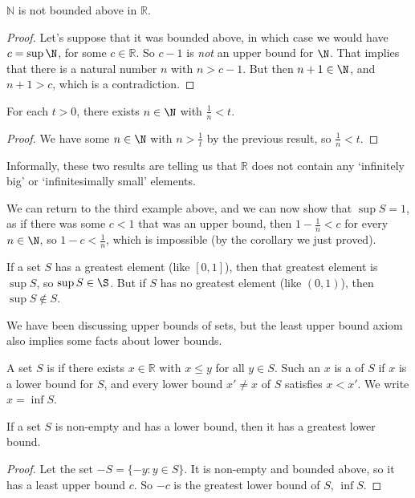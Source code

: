 \documentclass[a4paper]{scrartcl}
\begin{document}
\begin{theorem}
	$\mathbb{N}$ is not bounded above in $\mathbb{R}$.
\end{theorem}
\begin{proof}
	Let's suppose that it was bounded above, in which case we would have $c = \sup \N$, for some $c \in \mathbb{R}$. So $c - 1$ is \emph{not} an upper bound for $\N$. That implies that there is a natural number $n$ with $n > c - 1$. But then $n +1 \in \N$, and $n + 1 > c$, which is a contradiction.
\end{proof}

\begin{corollary}
	For each $t > 0$, there exists $n \in \N$ with $\frac{1}{n} < t$.
\end{corollary}
\begin{proof}
	We have some $n \in \N$ with $n > \frac{1}{t}$ by the previous result, so $\frac{1}{n} < t$.
\end{proof}

\begin{remark}
	Informally, these two results are telling us that $\mathbb{R}$ does not contain any `infinitely big' or `infinitesimally small' elements.
\end{remark}

We can return to the third example above, and we can now show that $\sup S = 1$, as if there was some $c < 1$ that was an upper bound, then $1 - \frac{1}{n} < c$ for every $n \in \N$, so $1 - c < \frac{1}{n}$, which is impossible (by the corollary we just proved).

\begin{remark}[Warning]
	If a set $S$ has a greatest element (like $[0, 1]$), then that greatest element is $\sup S$, so $\sup S \in \S$. But if $S$ has no greatest element (like $(0, 1)$), then $\sup S \not\in S$.
\end{remark}

We have been discussing upper bounds of sets, but the least upper bound axiom also implies some facts about lower bounds.

\begin{definition}
	A set $S$ is  if there exists $x \in \mathbb{R}$ with $x \leq y$ for all $y \in S$. Such an $x$ is a  of $S$ if $x$ is a lower bound for $S$, and every lower bound $x' \neq x$ of $S$ satisfies $x < x'$.
	We write $x = \inf S$.
\end{definition}

\begin{proposition}
If a set $S$ is non-empty and has a lower bound, then it has a greatest lower bound.	
\end{proposition}
\begin{proof}
	Let the set $-S = \{-y : y \in S\}$. It is non-empty and bounded above, so it has a least upper bound $c$. So $-c$ is the greatest lower bound of $S$, $\inf S$.
\end{proof}
\end{document}
